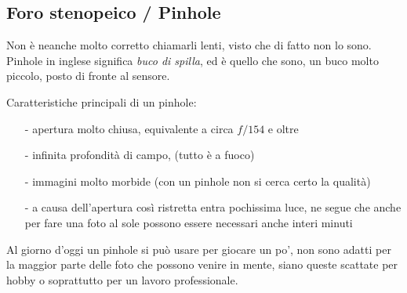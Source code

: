 \subsection{Foro stenopeico / Pinhole} \label{subsec:lentipinhole}
Non è neanche molto corretto chiamarli lenti, visto che di fatto non lo sono.
Pinhole in inglese significa \textit{buco di spilla}, ed è quello che sono, un buco molto piccolo, posto di fronte al sensore.

Caratteristiche principali di un pinhole:
\begin{itemize}
    \item[-] apertura molto chiusa, equivalente a circa $f/154$ e oltre
    \item[-] infinita profondità di campo, (tutto è a fuoco)
    \item[-] immagini molto morbide (con un pinhole non si cerca certo la qualità)
    \item[-] a causa dell'apertura così ristretta entra pochissima luce, ne segue che anche per fare una foto al sole possono essere necessari anche interi minuti   
\end{itemize}

Al giorno d'oggi un pinhole si può usare per giocare un po', non sono adatti per la maggior parte delle foto che possono venire in mente, siano queste scattate per hobby o soprattutto per un lavoro professionale.

